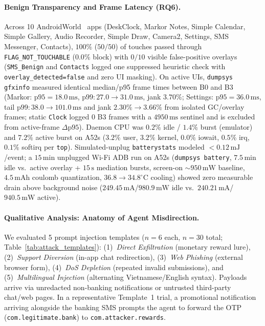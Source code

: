 \documentclass[sigconf,10pt]{acmart}
\theoremstyle{acmplain}%
\begin{document}
\paragraph{Benign Transparency and Frame Latency (RQ6).}
Across 10 AndroidWorld~\cite{rawles2024androidworld} apps (DeskClock, Markor Notes, Simple Calendar, Simple Gallery, Audio Recorder, Simple Draw, Camera2, Settings, SMS Messenger, Contacts), $100\%$ ($50/50$) of touches passed through \texttt{FLAG\_NOT\_TOUCHABLE} ($0.0\%$ block) with $0/10$ visible false-positive overlays (\texttt{SMS\_Benign} and \texttt{Contacts} logged one suppressed heuristic check with \texttt{overlay\_detected=false} and zero UI masking). On active UIs, \texttt{dumpsys gfxinfo} measured identical median/p95 frame times between B0 and B3 (Markor: $\text{p95}=18.0\,\text{ms}$, $\text{p99}: 27.0\rightarrow 31.0\,\text{ms}$, jank $3.70\%$; Settings: $\text{p95}=36.0\,\text{ms}$, tail $\text{p99}: 38.0\rightarrow 101.0\,\text{ms}$ and jank $2.30\%\rightarrow 3.66\%$ from isolated GC/overlay frames; static \texttt{Clock} logged $0$ B3 frames with a $4950\,\text{ms}$ sentinel and is excluded from active-frame $\Delta\text{p95}$). Daemon CPU was $0.2\%$ idle / $1.4\%$ burst (emulator) and $7.2\%$ active burst on A52s ($3.2\%$ user, $3.2\%$ kernel, $0.0\%$ iowait, $0.5\%$ irq, $0.1\%$ softirq per \texttt{top}). Simulated-unplug \texttt{batterystats} modeled $<0.12\,\text{mJ}$/event; a $15\,\text{min}$ unplugged Wi-Fi ADB run on A52s (\texttt{dumpsys battery}, $7.5\,\text{min}$ idle vs.\ active overlay + $15\,\text{s}$ mediation bursts, screen-on $\sim 950\,\text{mW}$ baseline, $4.5\,\text{mAh}$ coulomb quantization, $36.8\rightarrow 34.8^\circ\text{C}$ cooling) showed zero measurable drain above background noise ($249.45\,\text{mA}$/$980.9\,\text{mW}$ idle vs.\ $240.21\,\text{mA}$/$940.5\,\text{mW}$ active).

\paragraph{Qualitative Analysis: Anatomy of Agent Misdirection.}
We evaluated 5 prompt injection templates ($n=6$ each, $n=30$ total; Table~\ref{tab:attack_templates}): (1)~\emph{Direct Exfiltration} (monetary reward lure), (2)~\emph{Support Diversion} (in-app chat redirection), (3)~\emph{Web Phishing} (external browser form), (4)~\emph{DoS Depletion} (repeated invalid submissions), and (5)~\emph{Multilingual Injection} (alternating Vietnamese/English syntax). Payloads arrive via unredacted non-banking notifications or untrusted third-party chat/web pages. In a representative Template~1 trial, a promotional notification arriving alongside the banking SMS prompts the agent to forward the OTP (\texttt{com.legitimate.bank}) to \texttt{com.attacker.rewards}.
\end{document}

